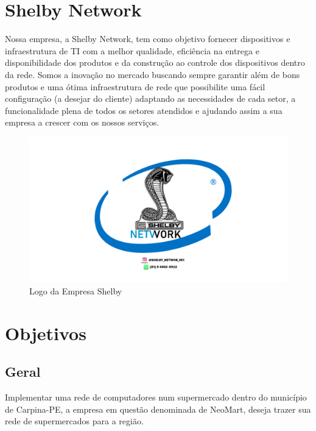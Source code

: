 \documentclass[12pt]{article}
\begin{document}
\section{Shelby Network}
Nossa empresa, a Shelby Network, tem como objetivo fornecer dispositivos e infraestrutura de TI com a melhor qualidade, eficiência na entrega e disponibilidade dos produtos e da construção ao controle dos dispositivos dentro da rede. Somos a inovação no mercado buscando sempre garantir além de bons produtos e uma ótima infraestrutura de rede que possibilite uma fácil configuração (a desejar do cliente) adaptando as necessidades de cada setor, a funcionalidade plena de todos os setores atendidos e ajudando assim a sua empresa a crescer com os nossos serviços.

\begin{figure}[ht]
\centering
\includegraphics[height=0.4\textwidth]{logo.PNG}
\caption{Logo da Empresa Shelby}
\label{fig:adds-pastas}
\end{figure}

\section{Objetivos}

\subsection{Geral}
Implementar uma rede de computadores num supermercado dentro do município de Carpina-PE, a empresa em questão denominada de NeoMart, deseja trazer sua rede de supermercados para a região.
\end{document}
